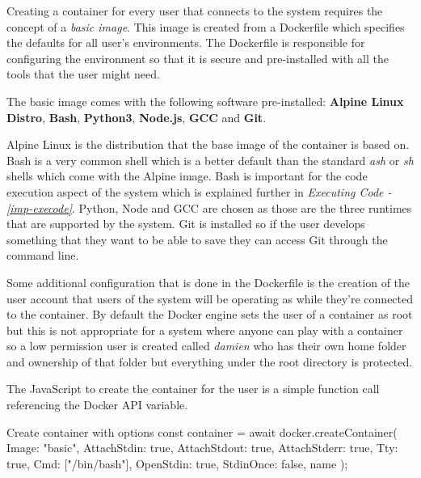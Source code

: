 Creating a container for every user that connects to the system requires the concept of a \textit{basic image}. This image is created from a Dockerfile which specifies the defaults for all user's environments. The Dockerfile is responsible for configuring the environment so that it is secure and pre-installed with all the tools that the user might need.

The basic image comes with the following software pre-installed: \textbf{Alpine Linux Distro}, \textbf{Bash}, \textbf{Python3}, \textbf{Node.js}, \textbf{GCC} and \textbf{Git}.

Alpine Linux is the distribution that the base image of the container is based on. Bash is a very common shell which is a better default than the standard \textit{ash} or \textit{sh} shells which come with the Alpine image. Bash is important for the code execution aspect of the system which is explained further in \textit{Executing Code - \ref{imp-execode}}. Python, Node and GCC are chosen as those are the three runtimes that are supported by the system. Git is installed so if the user develops something that they want to be able to save they can access Git through the command line.

Some additional configuration that is done in the Dockerfile is the creation of the user account that users of the system will be operating as while they're connected to the container. By default the Docker engine sets the user of a container as root but this is not appropriate for a system where anyone can play with a container so a low permission user is created called \textit{damien} who has their own home folder and ownership of that folder but everything under the root directory is protected.

The JavaScript to create the container for the user is a simple function call referencing the Docker API variable.

\begin{sexylisting}{Create container with options}
const container = await docker.createContainer({
    Image: "basic",
    AttachStdin: true,
    AttachStdout: true,
    AttachStderr: true,
    Tty: true,
    Cmd: ["/bin/bash"],
    OpenStdin: true,
    StdinOnce: false,
    name
});
\end{sexylisting}

